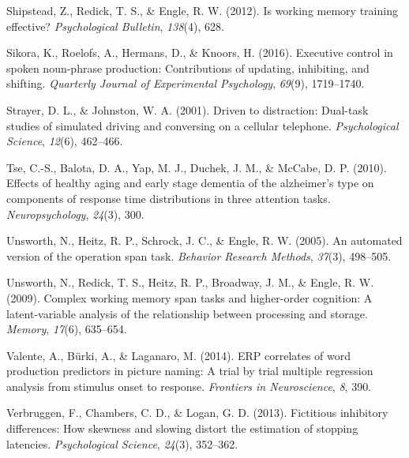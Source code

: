 \documentclass[
  man,floatsintext]{apa6}
\newlength{\cslhangindent}
\newlength{\cslentryspacingunit} %
\newenvironment{CSLReferences}[2] %
 {%
  \setlength{\parindent}{0pt}
  \ifodd #1
  \let\oldpar\par
  \def\par{\hangindent=\cslhangindent\oldpar}
  \fi
  \setlength{\parskip}{#2\cslentryspacingunit}
 }%
 {}
\begin{document}
\begin{CSLReferences}{1}{0}
\leavevmode{}%
Shipstead, Z., Redick, T. S., \& Engle, R. W. (2012). Is working memory training effective? \emph{Psychological Bulletin}, \emph{138}(4), 628.

\leavevmode{}%
Sikora, K., Roelofs, A., Hermans, D., \& Knoors, H. (2016). Executive control in spoken noun-phrase production: Contributions of updating, inhibiting, and shifting. \emph{Quarterly Journal of Experimental Psychology}, \emph{69}(9), 1719--1740.

\leavevmode{}%
Strayer, D. L., \& Johnston, W. A. (2001). Driven to distraction: Dual-task studies of simulated driving and conversing on a cellular telephone. \emph{Psychological Science}, \emph{12}(6), 462--466.

\leavevmode{}%
Tse, C.-S., Balota, D. A., Yap, M. J., Duchek, J. M., \& McCabe, D. P. (2010). Effects of healthy aging and early stage dementia of the alzheimer's type on components of response time distributions in three attention tasks. \emph{Neuropsychology}, \emph{24}(3), 300.

\leavevmode{}%
Unsworth, N., Heitz, R. P., Schrock, J. C., \& Engle, R. W. (2005). An automated version of the operation span task. \emph{Behavior Research Methods}, \emph{37}(3), 498--505.

\leavevmode{}%
Unsworth, N., Redick, T. S., Heitz, R. P., Broadway, J. M., \& Engle, R. W. (2009). Complex working memory span tasks and higher-order cognition: A latent-variable analysis of the relationship between processing and storage. \emph{Memory}, \emph{17}(6), 635--654.

\leavevmode{}%
Valente, A., Bürki, A., \& Laganaro, M. (2014). ERP correlates of word production predictors in picture naming: A trial by trial multiple regression analysis from stimulus onset to response. \emph{Frontiers in Neuroscience}, \emph{8}, 390.

\leavevmode{}%
Verbruggen, F., Chambers, C. D., \& Logan, G. D. (2013). Fictitious inhibitory differences: How skewness and slowing distort the estimation of stopping latencies. \emph{Psychological Science}, \emph{24}(3), 352--362.


\end{CSLReferences}
\end{document}
